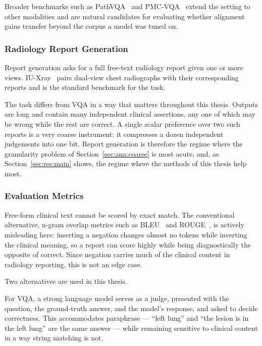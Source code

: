 Broader benchmarks such as PathVQA~\cite{he2020pathvqa} and PMC-VQA~\cite{zhang2023pmcvqa} extend the setting to other modalities and are natural candidates for evaluating whether alignment gains transfer beyond the corpus a model was tuned on.

\subsubsection{Radiology Report Generation}

Report generation asks for a full free-text radiology report given one or more views. IU-Xray~\cite{demner2016preparing} pairs dual-view chest radiographs with their corresponding reports and is the standard benchmark for the task.

The task differs from VQA in a way that matters throughout this thesis. Outputs are long and contain many independent clinical assertions, any one of which may be wrong while the rest are correct. A single scalar preference over two such reports is a very coarse instrument: it compresses a dozen independent judgements into one bit. Report generation is therefore the regime where the granularity problem of Section~\ref{sec:ana:coarse} is most acute, and, as Section~\ref{sec:res:main} shows, the regime where the methods of this thesis help most.

\subsubsection{Evaluation Metrics}

Free-form clinical text cannot be scored by exact match. The conventional alternative, n-gram overlap metrics such as BLEU~\cite{papineni2002bleu} and ROUGE~\cite{lin2004rouge}, is actively misleading here: inserting a negation changes almost no tokens while inverting the clinical meaning, so a report can score highly while being diagnostically the opposite of correct. Since negation carries much of the clinical content in radiology reporting, this is not an edge case.

Two alternatives are used in this thesis.

For VQA, a strong language model serves as a judge, presented with the question, the ground-truth answer, and the model's response, and asked to decide correctness. This accommodates paraphrase --- ``left lung'' and ``the lesion is in the left lung'' are the same answer --- while remaining sensitive to clinical content in a way string matching is not.

